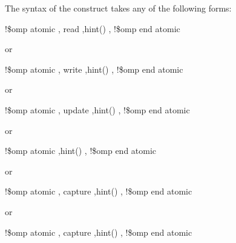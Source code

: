 \begin{fortranspecific}
The syntax of the  construct takes any of the following forms: 

\begin{boxedcode}
!\$omp atomic \plc{[memory-order-clause[},\plc{]]} read \plc{[[},\plc{]}hint()\plc{]} 
             \plc{[[},\plc{]memory-order-clause]} 
\plc{[}!\$omp end atomic\plc{]}
\end{boxedcode}

or

\begin{boxedcode}
!\$omp atomic \plc{[memory-order-clause[},\plc{]]} write \plc{[[},\plc{]}hint()\plc{]} 
             \plc{[[},\plc{]memory-order-clause]}
\plc{[}!\$omp end atomic\plc{]}
\end{boxedcode}

or

\begin{boxedcode}
!\$omp atomic \plc{[memory-order-clause[},\plc{]]} update \plc{[[},\plc{]}hint()\plc{]} 
             \plc{[[},\plc{]memory-order-clause]}
\plc{[}!\$omp end atomic\plc{]}
\end{boxedcode}

or

\begin{boxedcode}
!\$omp atomic  \plc{[[},\plc{]}hint()\plc{]} 
             \plc{[[},\plc{]memory-order-clause]}
\plc{[}!\$omp end atomic\plc{]}
\end{boxedcode}

or

\begin{boxedcode}
!\$omp atomic \plc{[memory-order-clause[},\plc{]]} capture \plc{[[},\plc{]}hint()\plc{]}
             \plc{[[},\plc{]memory-order-clause]}
!\$omp end atomic
\end{boxedcode}

or

\begin{boxedcode}
!\$omp atomic \plc{[memory-order-clause[},\plc{]]} capture \plc{[[},\plc{]}hint()\plc{]} 
             \plc{[[},\plc{]memory-order-clause]}
!\$omp end atomic
\end{boxedcode}


\end{fortranspecific}
